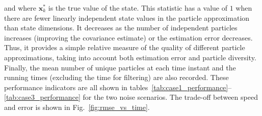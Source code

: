 \documentclass[peerreview,11pt,draftcls,onecolumn]{IEEEtran}
\begin{document}
\noindent and where $\mathbf{x}_k^*$ is the true value of the state. This statistic has a value of $1$ when there are fewer linearly independent state values in the particle approximation than state dimensions. It decreases as the number of independent particles increases (improving the covariance estimate) or the estimation error decreases. Thus, it provides a simple relative measure of the quality of different particle approximations, taking into account both estimation error and particle diversity. Finally, the mean number of unique particles at each time instant and the running times (excluding the time for filtering) are also recorded. These performance indicators are all shown in tables~\ref{tab:case1_performance}--\ref{tab:case3_performance} for the two noise scenarios. The trade-off between speed and error is shown in Fig.~\ref{fig:rmse_vs_time}.
\end{document}
